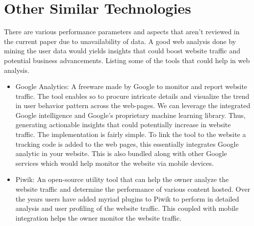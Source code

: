 \section{Other Similar Technologies} \label{similartech}
There are various performance parameters and aspects that aren’t reviewed in the current paper due to unavailability of data. A good web analysis done by mining the user data would yields insights that could boost website traffic and potential business advancements. Listing some of the tools that could help in web analysis. 
\begin{itemize}
\item Google Analytics:
A freeware made by Google to monitor and report website traffic. The tool enables so to procure intricate details and visualize the trend in user behavior pattern across the web-pages. We can leverage the integrated Google intelligence and Google’s proprietary machine learning library. Thus, generating actionable insights that could potentially increase in website traffic. The implementation is fairly simple. To link the tool to the website a tracking code is added to the web pages, this essentially integrates Google analytic in your website. This is also bundled along with other Google services which would help monitor the website via mobile devices.
\item Piwik:
An open-source utility tool that can help the owner analyze the website traffic and determine the performance of various content hosted. Over the years users have added myriad plugins to Piwik to perform in detailed analysis and user profiling of the website traffic. This coupled with mobile integration helps the owner monitor the website traffic.
\end{itemize}

